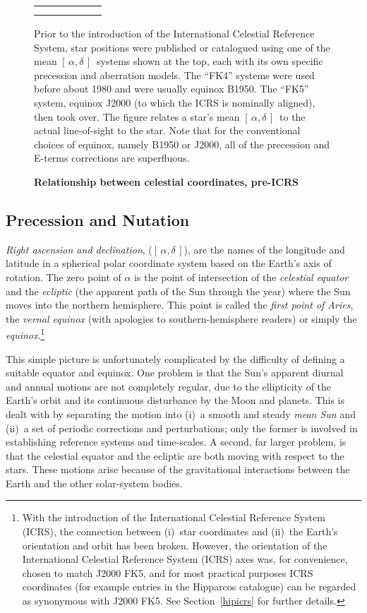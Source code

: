 \documentclass[11pt,fleqn,twoside]{article}
\renewcommand{\_}{{\tt\char'137}}     %
\newcommand{\radec}     {$[\,\alpha,\delta\,]$}
\begin{document}
\begin{figure}
\begin{center}
\begin{tabular}{|cccccc|}
& & & & & \\
& & & & & \\ \hline
\end{tabular}
\end{center}
\vspace{-0.5ex}
\caption{\bf Relationship between celestial coordinates, pre-ICRS}
\label{figclass}
{\small Prior to the introduction of the
International Celestial Reference System,
star positions were published or catalogued using
one of the mean \radec\ systems shown at
the top, each with its own specific precession and
aberration models.  The ``FK4'' systems
were used before about 1980 and were usually
equinox B1950.  The ``FK5'' system, equinox J2000 (to which
the ICRS is nominally aligned), then took over.
The figure relates a star's mean \radec\ to the actual
line-of-sight to the star.
Note that for the conventional choices of equinox, namely
B1950 or J2000, all of the precession and E-terms corrections
are superfluous.}
\end{figure}

\subsection{Precession and Nutation}
{\it Right ascension and declination}, (\radec), are the names
of the longitude and latitude in a spherical
polar coordinate system based on the Earth's axis of rotation.
The zero point of $\alpha$ is the point of intersection of
the {\it celestial
equator}\/ and the {\it ecliptic}\/ (the apparent path of the Sun
through the year) where the Sun moves into the northern
hemisphere.  This point is called the
{\it first point of Aries},
the {\it vernal equinox}\/ (with apologies to
southern-hemisphere readers) or simply the {\it equinox}.\footnote{With
the introduction of the International Celestial Reference System (ICRS), the
connection between (i)~star coordinates and (ii)~the Earth's orientation
and orbit has been broken.  However, the orientation of the
International Celestial Reference System (ICRS) axes was, for convenience,
chosen to match J2000 FK5, and for most practical purposes ICRS coordinates
(for example entries in the Hipparcos catalogue) can be regarded as
synonymous with J2000 FK5.  See Section~\ref{hipicrs} for further details.}
 
This simple picture is unfortunately
complicated by the difficulty of defining
a suitable equator and equinox.  One problem is that the
Sun's apparent diurnal and annual motions
are not completely regular, due to the
ellipticity of the Earth's orbit and its continuous disturbance
by the Moon and planets.  This is dealt with by
separating the motion into (i)~a smooth and steady {\it mean Sun}\/
and (ii)~a set of periodic corrections and perturbations; only the former
is involved in establishing reference systems and time-scales.
A second, far larger problem, is that
the celestial equator and the ecliptic
are both moving with respect to the stars.
These motions arise because of the gravitational
interactions between the Earth and the other solar-system bodies.
 
\end{document}
